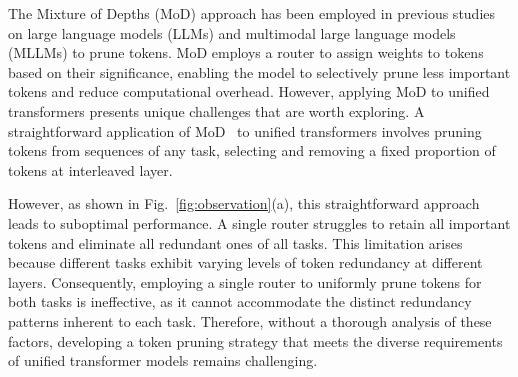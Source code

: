 The Mixture of Depths (MoD) approach has been employed in previous studies on large language models (LLMs)\cite{mod} and multimodal large language models (MLLMs)\cite{gamma-mod,videollmmod,pmod} to prune tokens. MoD employs a router to assign weights to tokens based on their significance, enabling the model to selectively prune less important tokens and reduce computational overhead. However, applying MoD to unified transformers presents unique challenges that are worth exploring. A straightforward application of MoD~\cite{moma} to unified transformers involves pruning tokens from sequences of any task, selecting and removing a fixed proportion of tokens at interleaved layer. 


However, as shown in Fig.~\ref{fig:observation}(a), this straightforward approach leads to suboptimal performance. A single router struggles to retain all important tokens and eliminate all redundant ones of all tasks. This limitation arises because different tasks exhibit varying levels of token redundancy at different layers. Consequently, employing a single router to uniformly prune tokens for both tasks is ineffective, as it cannot accommodate the distinct redundancy patterns inherent to each task. Therefore, without a thorough analysis of these factors, developing a token pruning strategy that meets the diverse requirements of unified transformer models remains challenging.

